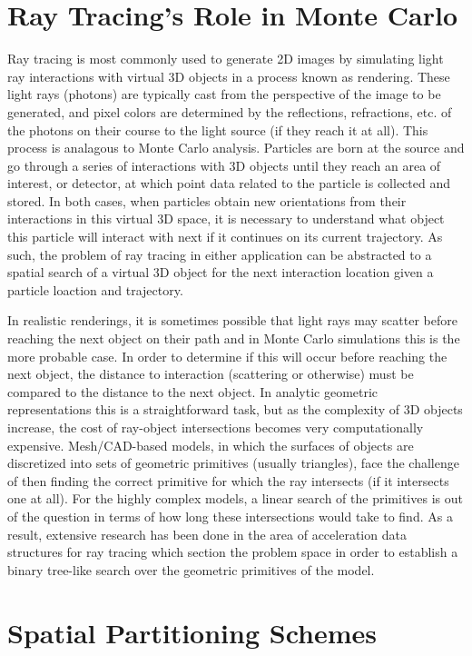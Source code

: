 \documentclass[10pt, a4paper]{article}
\begin{document}
\section{Ray Tracing's Role in Monte Carlo}

Ray tracing is most commonly used to generate 2D images by simulating light ray interactions with virtual 3D objects in a process known as rendering. These light rays (photons) are typically cast from the perspective of the image to be generated, and pixel colors are determined by the reflections, refractions, etc. of the photons on their course to the light source (if they reach it at all). This process is analagous to Monte Carlo analysis. Particles are born at the source and go through a series of interactions with 3D objects until they reach an area of interest, or detector, at which point data related to the particle is collected and stored. In both cases, when particles obtain new orientations from their interactions in this virtual 3D space, it is necessary to understand what object this particle will interact with next if it continues on its current trajectory. As such, the problem of ray tracing in either application can be abstracted to a spatial search of a virtual 3D object for the next interaction location given a particle loaction and trajectory. 

In realistic renderings, it is sometimes possible that light rays may scatter before reaching the next object on their path and in Monte Carlo simulations this is the more probable case. In order to determine if this will occur before reaching the next object, the distance to interaction (scattering or otherwise) must be compared to the distance to the next object. In analytic geometric representations this is a straightforward task, but as the complexity of 3D objects increase, the cost of ray-object intersections becomes very computationally expensive. Mesh/CAD-based models, in which the surfaces of objects are discretized into sets of geometric primitives (usually triangles), face the challenge of then finding the correct primitive for which the ray intersects (if it intersects one at all). For the highly complex models, a linear search of the primitives is out of the question in terms of how long these intersections would take to find. As a result, extensive research has been done in the area of acceleration data structures for ray tracing which section the problem space in order to establish a binary tree-like search over the geometric primitives of the model.

\section{Spatial Partitioning Schemes}
\end{document}
